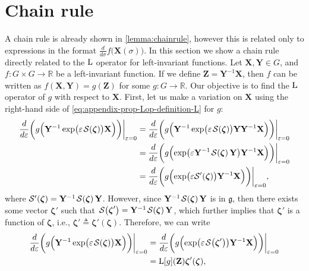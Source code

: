 \section{Chain rule}
A chain rule is already shown in \cref{lemma:chainrule}, however this is related only to expressions in the format $\frac{d}{d\sigma}f\bigl(\mathbf{X}(\sigma)\bigr)$. In this section we show a chain rule directly related to the $\operatorname{L}$ operator for left-invariant functions. Let $\mathbf{X},\mathbf{Y}\in G$, and $f : G \times G \to \mathbb{R}$ be a left-invariant function. If we define $\mathbf{Z} = \mathbf{Y}^{-1}\mathbf{X}$, then $f$ can be written as $f(\mathbf{X},\mathbf{Y}) = g(\mathbf{Z})$ for some $g:G\to\mathbb{R}$. Our objective is to find the $\operatorname{L}$ operator of $g$ with respect to $\mathbf{X}$. First, let us make a variation on $\mathbf{X}$ using the right-hand side of \eqref{eq:appendix-prop-Lop-definition-L} for $g$:
\begin{align}
    \frac{d}{d\varepsilon}\biggl(g\Bigl(\mathbf{Y}^{-1}\exp\bigl(\varepsilon\SL[\boldsymbol{\zeta}]\bigr)\mathbf{X}\Bigr)\biggr)\biggr|_{\varepsilon=0} &= \frac{d}{d\varepsilon}\biggl(g\Bigl(\mathbf{Y}^{-1}\exp\bigl(\varepsilon\SL[\boldsymbol{\zeta}]\bigr)\mathbf{Y}\mathbf{Y}^{-1}\mathbf{X}\Bigr)\biggr)\biggr|_{\varepsilon=0}\\
    &= \frac{d}{d\varepsilon}\biggl(g\Bigl(\exp\bigl(\varepsilon\mathbf{Y}^{-1}\SL[\boldsymbol{\zeta}]\mathbf{Y}\bigr)\mathbf{Y}^{-1}\mathbf{X}\Bigr)\biggr)\biggr|_{\varepsilon=0} \\
    &= \frac{d}{d\varepsilon}\biggl(g\Bigl(\exp\bigl(\varepsilon\mathcal{S}'(\boldsymbol{\zeta})\bigr)\mathbf{Y}^{-1}\mathbf{X}\Bigr)\biggr)\biggr|_{\varepsilon=0},
\end{align}
where $\mathcal{S}'(\boldsymbol{\zeta}) = \mathbf{Y}^{-1}\SL[\boldsymbol{\zeta}]\mathbf{Y}$. However, since $\mathbf{Y}^{-1}\SL[\boldsymbol{\zeta}]\mathbf{Y}$ is in $\mathfrak{g}$, then there exists some vector $\boldsymbol{\zeta}'$ such that $\SL[\boldsymbol{\zeta}'] = \mathbf{Y}^{-1}\SL[\boldsymbol{\zeta}]\mathbf{Y}$, which further implies that $\boldsymbol{\zeta}'$ is a function of $\boldsymbol{\zeta}$, i.e., $\boldsymbol{\zeta}' \triangleq \boldsymbol{\zeta}'(\boldsymbol{\zeta})$. Therefore, we can write
\begin{align}
    \frac{d}{d\varepsilon}\biggl(g\Bigl(\mathbf{Y}^{-1}\exp\bigl(\varepsilon\SL[\boldsymbol{\zeta}]\bigr)\mathbf{X}\Bigr)\biggr)\biggr|_{\varepsilon=0} &= \frac{d}{d\varepsilon}\biggl(g\Bigl(\exp\bigl(\varepsilon\SL[\boldsymbol{\zeta}']\bigr)\mathbf{Y}^{-1}\mathbf{X}\Bigr)\biggr)\biggr|_{\varepsilon=0}\\
    &= \Lop[g](\mathbf{Z})\boldsymbol{\zeta}'(\boldsymbol{\zeta}) \label{appendix-prop-Lop-chain-rule-LgZ-zeta-prime},
\end{align}
